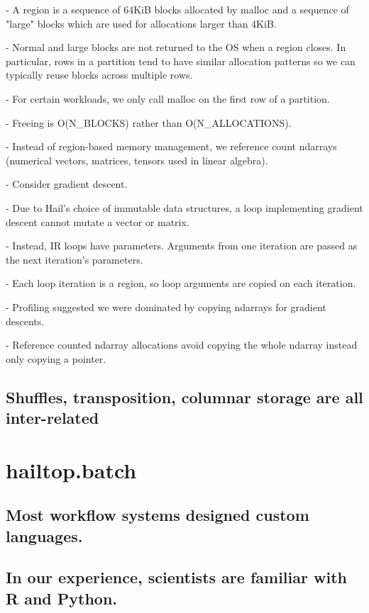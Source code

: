 \documentclass[10pt,a4paper%
]{article}
\begin{document}
      - A region is a sequence of 64KiB blocks allocated by malloc and a sequence of "large" blocks which are used for allocations larger than 4KiB.

      - Normal and large blocks are not returned to the OS when a region closes. In particular, rows in a partition tend to have similar allocation patterns so we can typically reuse blocks across multiple rows.

      - For certain workloads, we only call malloc on the first row of a partition.

      - Freeing is O(N\_BLOCKS) rather than O(N\_ALLOCATIONS).

    - Instead of region-based memory management, we reference count ndarrays (numerical vectors, matrices, tensors used in linear algebra).

      - Consider gradient descent.

      - Due to Hail’s choice of immutable data structures, a loop implementing gradient descent cannot mutate a vector or matrix.

      - Instead, IR loops have parameters. Arguments from one iteration are passed as the next iteration’s parameters.

      - Each loop iteration is a region, so loop arguments are copied on each iteration.

      - Profiling suggested we were dominated by copying ndarrays for gradient descents.

      - Reference counted ndarray allocations avoid copying the whole ndarray instead only copying a pointer.

\subsection{Shuffles, transposition, columnar storage are all inter-related}

\section{hailtop.batch}

\subsection{Most workflow systems designed custom languages.}

\subsection{In our experience, scientists are familiar with R and Python.}
\end{document}
